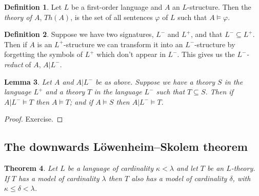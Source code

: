 \documentclass[10pt, a4paper, oneside]{article}
\newtheorem{thm}{Theorem}[section]
\theoremstyle{definition}
\newtheorem{dfn}[thm]{Definition}
\theoremstyle{remark}
\theoremstyle{plain}
\newtheorem{lem}[thm]{Lemma}
\theoremstyle{plain}
\begin{document}
\begin{dfn}
    Let $L$ be a first-order language and $A$ an $L$-structure. Then the
    \emph{theory of $A$}, $Th(A)$, is the set of all sentences $\varphi$ of $L$
    such that $A \models \varphi$.
\end{dfn}

\begin{dfn}
    Suppose we have two signatures, $L^-$ and $L^+$, and that $L^- \subseteq
    L^+$. Then if $A$ is an $L^+$-structure we can transform it into an
    $L^-$-structure by forgetting the symbols of $L^+$ which don't appear in
    $L^-$. This gives us the \emph{$L^-$-reduct} of $A$, $A|L^-$.
\end{dfn}

\begin{lem}
    \label{lem:reducts}
    Let $A$ and $A| L^-$ be as above. Suppose we have a theory $S$ in the
    language $L^+$ and a theory $T$ in the language $L^-$ such that
    $T \subseteq S$. Then if $A|L^- \models T$ then $A \models T$; and if
    $A \models S$ then $A| L^- \models T$.
\end{lem}

\begin{proof}
    Exercise.
\end{proof}

\subsection{The downwards Löwenheim--Skolem theorem}

\begin{thm}
    Let $L$ be a language of cardinality $\kappa < \lambda$ and let $T$ be an
    $L$-theory. If $T$ has a model of cardinality $\lambda$ then $T$ also has a
    model of cardinality $\delta$, with $\kappa \leq \delta < \lambda$.
\end{thm}
\end{document}

